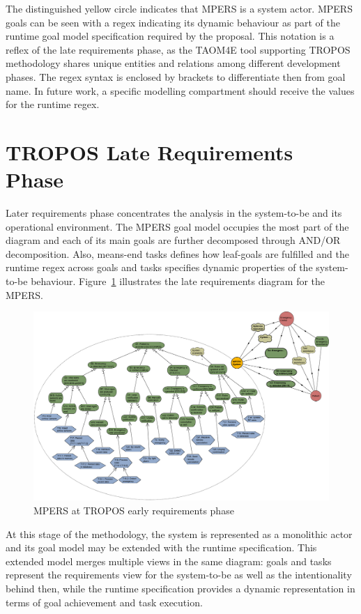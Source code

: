 The distinguished yellow circle indicates that MPERS is a system actor. MPERS goals can be seen with a regex indicating its dynamic behaviour as part of the runtime goal model specification required by the proposal. This notation is a reflex of the late requirements phase, as the TAOM4E tool supporting TROPOS methodology shares unique entities and relations among different development phases. The regex syntax is enclosed by brackets to differentiate then from goal name. In future work, a specific modelling compartment should receive the values for the runtime regex.

\section{TROPOS Late Requirements Phase}

Later requirements phase concentrates the analysis in the system-to-be and its operational environment. The MPERS goal model occupies the most part of the diagram and each of its main goals are further decomposed through AND/OR decomposition. Also, means-end tasks defines how leaf-goals are fulfilled and the runtime regex across goals and tasks specifies dynamic properties of the system-to-be behaviour. Figure~\ref{fig:MPERS_LR} illustrates the late requirements diagram for the MPERS.

\begin{figure}[h!]
\centering
\includegraphics[width=1\textwidth]{imgs/MPERS_LR.png}
\caption{MPERS at TROPOS early requirements phase}
\label{fig:MPERS_LR}
\end{figure}

At this stage of the methodology, the system is represented as a monolithic actor and its goal model may be extended with the runtime specification. This extended model merges multiple views in the same diagram: goals and tasks represent the requirements view for the system-to-be as well as the intentionality behind then, while the runtime specification provides a dynamic representation in terms of goal achievement  and task execution.

